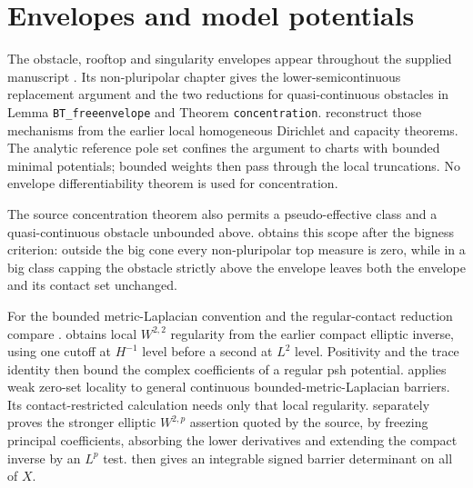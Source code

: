 \section{Envelopes and model potentials}\label{sec:history-envelopes}
The obstacle, rooftop and singularity envelopes appear throughout the supplied manuscript \cite{XiaSampleBook}. Its non-pluripolar chapter gives the lower-semicontinuous replacement argument and the two reductions for quasi-continuous obstacles in Lemma \texttt{BT\_freeenvelope} and Theorem \texttt{concentration}.  reconstruct those mechanisms from the earlier local homogeneous Dirichlet and capacity theorems. The analytic reference pole set confines the argument to charts with bounded minimal potentials; bounded weights then pass through the local truncations. No envelope differentiability theorem is used for concentration.

The source concentration theorem also permits a pseudo-effective class and a quasi-continuous obstacle unbounded above.  obtains this scope after the bigness criterion: outside the big cone every non-pluripolar top measure is zero, while in a big class capping the obstacle strictly above the envelope leaves both the envelope and its contact set unchanged.

For the bounded metric-Laplacian convention and the regular-contact reduction compare \cite[p.~4 and Lemma 3.1, pp.~4--5]{DNT2019v1}.  obtains local $W^{2,2}$ regularity from the earlier compact elliptic inverse, using one cutoff at $H^{-1}$ level before a second at $L^2$ level. Positivity and the trace identity then bound the complex coefficients of a regular psh potential.  applies weak zero-set locality to general continuous bounded-metric-Laplacian barriers. Its contact-restricted calculation needs only that local regularity.  separately proves the stronger elliptic $W^{2,p}$ assertion quoted by the source, by freezing principal coefficients, absorbing the lower derivatives and extending the compact inverse by an $L^p$ test.  then gives an integrable signed barrier determinant on all of $X$.

